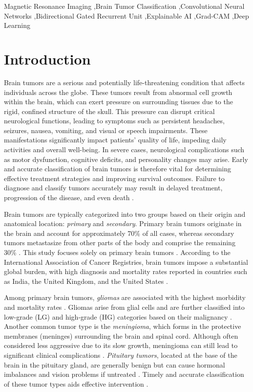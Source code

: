 \documentclass[a4paper,fleqn]{cas-sc}
\begin{document}
        \begin{keywords}
        Magnetic Resonance Imaging \sep Brain Tumor Classification \sep Convolutional Neural Networks \sep Bidirectional Gated Recurrent Unit \sep Explainable AI \sep Grad-CAM \sep Deep Learning
        \end{keywords}

        \maketitle
\section{Introduction}\label{sec1}

Brain tumors are a serious and potentially life-threatening condition that affects individuals across the globe. These tumors result from abnormal cell growth within the brain, which can exert pressure on surrounding tissues due to the rigid, confined structure of the skull. This pressure can disrupt critical neurological functions, leading to symptoms such as persistent headaches, seizures, nausea, vomiting, and visual or speech impairments. These manifestations significantly impact patients’ quality of life, impeding daily activities and overall well-being. In severe cases, neurological complications such as motor dysfunction, cognitive deficits, and personality changes may arise. Early and accurate classification of brain tumors is therefore vital for determining effective treatment strategies and improving survival outcomes. Failure to diagnose and classify tumors accurately may result in delayed treatment, progression of the disease, and even death \cite{R1}.

Brain tumors are typically categorized into two groups based on their origin and anatomical location: \textit{primary} and \textit{secondary}. Primary brain tumors originate in the brain and account for approximately 70\% of all cases, whereas secondary tumors metastasize from other parts of the body and comprise the remaining 30\% \cite{R2}. This study focuses solely on primary brain tumors \cite{R54, R55}. According to the International Association of Cancer Registries, brain tumors impose a substantial global burden, with high diagnosis and mortality rates reported in countries such as India, the United Kingdom, and the United States \cite{R4, R5, R56, R57}.

Among primary brain tumors, \textit{gliomas} are associated with the highest morbidity and mortality rates \cite{R1}. Gliomas arise from glial cells and are further classified into low-grade (LG) and high-grade (HG) categories based on their malignancy \cite{R8}. Another common tumor type is the \textit{meningioma}, which forms in the protective membranes (meninges) surrounding the brain and spinal cord. Although often considered less aggressive due to its slow growth, meningioma can still lead to significant clinical complications \cite{R9}. \textit{Pituitary tumors}, located at the base of the brain in the pituitary gland, are generally benign but can cause hormonal imbalances and vision problems if untreated \cite{R10, R1}. Timely and accurate classification of these tumor types aids effective intervention \cite{R9}.
\end{document}

